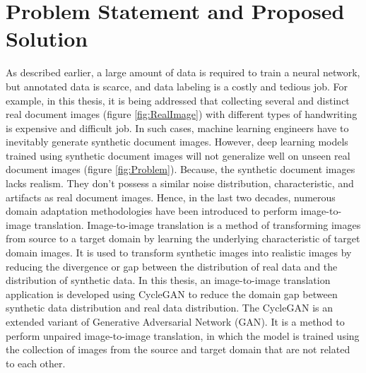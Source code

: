\section{Problem Statement and Proposed Solution}\label{ProblemStatement}

As described earlier, a large amount of data is required to train a neural network, but annotated data is scarce, and data labeling is a costly and tedious job. For example, in this thesis, it is being addressed that collecting several and distinct real document images (figure \ref{fig:RealImage}) with different types of handwriting is expensive and difficult job. In such cases, machine learning engineers have to inevitably generate synthetic document images. However, deep learning models trained using synthetic document images will not generalize well on unseen real document images\cite{8978087} (figure \ref{fig:Problem}). Because, the synthetic document images lacks realism\cite{8978087}. They don't possess a similar noise distribution, characteristic, and artifacts as real document images\cite{8978087}. Hence, in the last two decades, numerous domain adaptation methodologies have been introduced to perform image-to-image translation\cite{8978011}. Image-to-image translation is a method of transforming images from source to a target domain by learning the underlying characteristic of target domain images. It is used to transform synthetic images into realistic images by reducing the divergence or gap between the distribution of real data and the distribution of synthetic data. In this thesis, an image-to-image translation application is developed using \ac{CycleGAN} to reduce the domain gap between synthetic data distribution and real data distribution\cite{zhu2020unpaired}. The \ac{CycleGAN} is an extended variant of Generative Adversarial Network (\ac{GAN})\cite{goodfellow2014generative}. It is a method to perform unpaired image-to-image translation, in which the model is trained using the collection of images from the source and target domain that are not related to each other\footnotemark.


